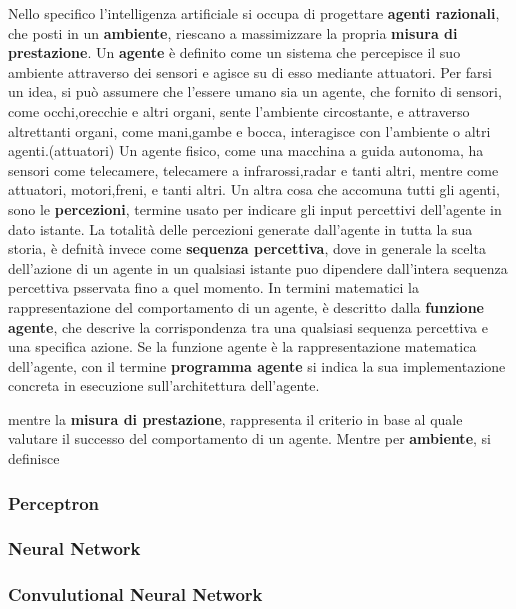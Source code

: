 \documentclass[14pt]{extarticle}
\begin{document}
Nello specifico l'intelligenza artificiale si occupa di progettare \textbf{agenti razionali}, che posti in un \textbf{ambiente}, riescano a massimizzare la propria \textbf{misura di prestazione}.
Un \textbf{agente} è definito  come un sistema che percepisce il suo ambiente attraverso dei sensori e agisce su di esso mediante attuatori. Per farsi un idea, si può assumere che l'essere umano sia un agente, che fornito di sensori, come occhi,orecchie e altri organi, sente l'ambiente circostante, e attraverso altrettanti organi, come mani,gambe e bocca, interagisce con l'ambiente o altri agenti.(attuatori)
Un agente fisico, come una macchina a guida autonoma, ha sensori come telecamere, telecamere a infrarossi,radar e tanti altri, mentre come attuatori, motori,freni, e tanti altri. 
Un altra cosa che accomuna tutti gli agenti, sono le  \textbf{percezioni}, termine usato per indicare gli input percettivi dell'agente in dato istante. 
La totalità delle percezioni generate dall'agente in tutta la sua storia, è defnità invece come \textbf{sequenza percettiva}, dove in generale la scelta dell'azione di un agente in un qualsiasi istante puo dipendere dall'intera sequenza percettiva psservata fino a quel momento.
In termini matematici la rappresentazione del comportamento di un agente, è descritto dalla \textbf{funzione agente}, che descrive la corrispondenza tra una qualsiasi sequenza percettiva e una specifica azione.
Se la funzione agente è la rappresentazione matematica dell'agente, con il termine \textbf{programma agente} si indica la sua implementazione concreta  in  esecuzione sull'architettura dell'agente.   





 mentre la \textbf{misura di prestazione}, rappresenta il criterio in base al quale valutare il successo del comportamento di un agente.
Mentre per \textbf{ambiente}, si definisce
\subsubsection{Perceptron}
\subsubsection{Neural Network}

\subsubsection{Convulutional Neural Network}
\end{document}
